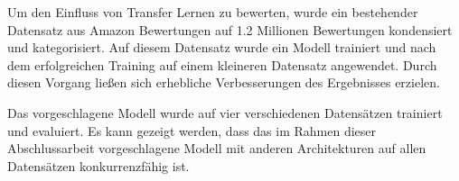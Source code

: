 Um den Einfluss von Transfer Lernen zu bewerten, wurde ein bestehender Datensatz aus Amazon Bewertungen auf 1.2 Millionen Bewertungen kondensiert und kategorisiert. Auf diesem Datensatz wurde ein Modell trainiert und nach dem erfolgreichen Training auf einem kleineren Datensatz angewendet. Durch diesen Vorgang ließen sich erhebliche Verbesserungen des Ergebnisses erzielen.
\medskip

Das vorgeschlagene Modell wurde auf vier verschiedenen Datensätzen trainiert und evaluiert. Es kann gezeigt werden, dass das im Rahmen dieser Abschlussarbeit vorgeschlagene Modell mit anderen Architekturen auf allen Datensätzen konkurrenzfähig ist.
